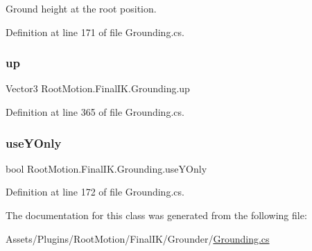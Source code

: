 Ground height at the root position. 



Definition at line 171 of file Grounding.\+cs.

\mbox{\label{class_root_motion_1_1_final_i_k_1_1_grounding_a9af0fc4bfd15fd3fe330175369f9dcbb}} 
\subsubsection{\texorpdfstring{up}{up}}
{\footnotesize\ttfamily Vector3 Root\+Motion.\+Final\+I\+K.\+Grounding.\+up\hspace{0.3cm}{\ttfamily [get]}}



Definition at line 365 of file Grounding.\+cs.

\mbox{\label{class_root_motion_1_1_final_i_k_1_1_grounding_a04bb7d32e24a31b9ab0021fef1332c8d}} 
\subsubsection{\texorpdfstring{use\+Y\+Only}{useYOnly}}
{\footnotesize\ttfamily bool Root\+Motion.\+Final\+I\+K.\+Grounding.\+use\+Y\+Only\hspace{0.3cm}{\ttfamily [get]}}



Definition at line 172 of file Grounding.\+cs.



The documentation for this class was generated from the following file\+:\begin{DoxyCompactItemize}
\item 
Assets/\+Plugins/\+Root\+Motion/\+Final\+I\+K/\+Grounder/\mbox{\hyperlink{_grounding_8cs}{Grounding.\+cs}}\end{DoxyCompactItemize}
